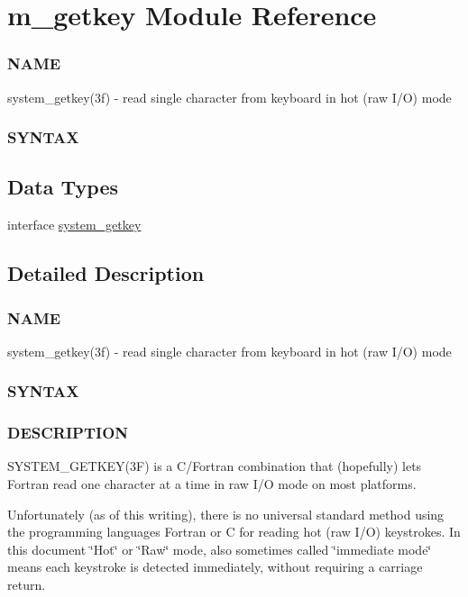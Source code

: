 \hypertarget{namespacem__getkey}{}\section{m\+\_\+getkey Module Reference}
\label{namespacem__getkey}


\subsubsection*{N\+A\+ME}

system\+\_\+getkey(3f) -\/ read single character from keyboard in hot (raw I/O) mode \subsubsection*{S\+Y\+N\+T\+AX} 


\subsection*{Data Types}
\begin{DoxyCompactItemize}
\item 
interface \hyperlink{interfacem__getkey_1_1system__getkey}{system\+\_\+getkey}
\end{DoxyCompactItemize}


\subsection{Detailed Description}
\subsubsection*{N\+A\+ME}

system\+\_\+getkey(3f) -\/ read single character from keyboard in hot (raw I/O) mode \subsubsection*{S\+Y\+N\+T\+AX}

\subsubsection*{D\+E\+S\+C\+R\+I\+P\+T\+I\+ON}

S\+Y\+S\+T\+E\+M\+\_\+\+G\+E\+T\+K\+E\+Y(3\+F) is a C/\+Fortran combination that (hopefully) lets Fortran read one character at a time in raw I/O mode on most platforms.

Unfortunately (as of this writing), there is no universal standard method using the programming languages Fortran or C for reading hot (raw I/O) keystrokes. In this document \char`\"{}\+Hot\char`\"{} or \char`\"{}\+Raw\char`\"{} mode, also sometimes called \char`\"{}immediate mode\char`\"{} means each keystroke is detected immediately, without requiring a carriage return.

